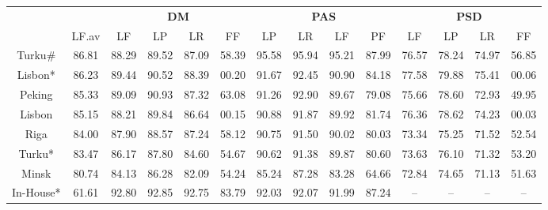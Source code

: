 \begin{table}
    \centering
    \smaller[]
    \smaller[]
    \smaller[0.5]
    \begin{tabular}{@{}cccccccccccccc@{}}
        \toprule
        \multicolumn{1}{c}{ }
        & \multicolumn{1}{c}{ }
        & \multicolumn{4}{c}{\textbf{DM}}
        & \multicolumn{4}{c}{\textbf{PAS}}
        & \multicolumn{4}{c}{\textbf{PSD}} \\
        \cmidrule(lr){3-6}
        \cmidrule(lr){7-10}
        \cmidrule(lr){11-14}
        &
        LF.av &
        LF & LP & LR & FF &
        LP & LR & LF & PF &
        LF & LP & LR & FF \\
        \midrule
        Turku\# & 86.81 & 88.29 & 89.52 & 87.09 & 58.39 & 95.58 & 95.94 & 95.21 & 87.99 & 76.57 & 78.24 & 74.97 & 56.85 \\
        Lisbon* & 86.23 & 89.44 & 90.52 & 88.39 & 00.20 & 91.67 & 92.45 & 90.90 & 84.18 & 77.58 & 79.88 & 75.41 & 00.06 \\
        Peking & 85.33 & 89.09 & 90.93 & 87.32 & 63.08 & 91.26 & 92.90 & 89.67 & 79.08 & 75.66 & 78.60 & 72.93 & 49.95 \\
        Lisbon & 85.15 & 88.21 & 89.84 & 86.64 & 00.15 & 90.88 & 91.87 & 89.92 & 81.74 & 76.36 & 78.62 & 74.23 & 00.03 \\
        Riga & 84.00 & 87.90 & 88.57 & 87.24 & 58.12 & 90.75 & 91.50 & 90.02 & 80.03 & 73.34 & 75.25 & 71.52 & 52.54 \\
        Turku* & 83.47 & 86.17 & 87.80 & 84.60 & 54.67 & 90.62 & 91.38 & 89.87 & 80.60 & 73.63 & 76.10 & 71.32 & 53.20 \\
        Minsk & 80.74 & 84.13 & 86.28 & 82.09 & 54.24 & 85.24 & 87.28 & 83.28 & 64.66 & 72.84 & 74.65 & 71.13 & 51.63 \\
        In-House* & 61.61 & 92.80 & 92.85 & 92.75 & 83.79 & 92.03 & 92.07 & 91.99 & 87.24 & – & – & – & – \\
        \bottomrule
        

\end{tabular}
\end{table}
